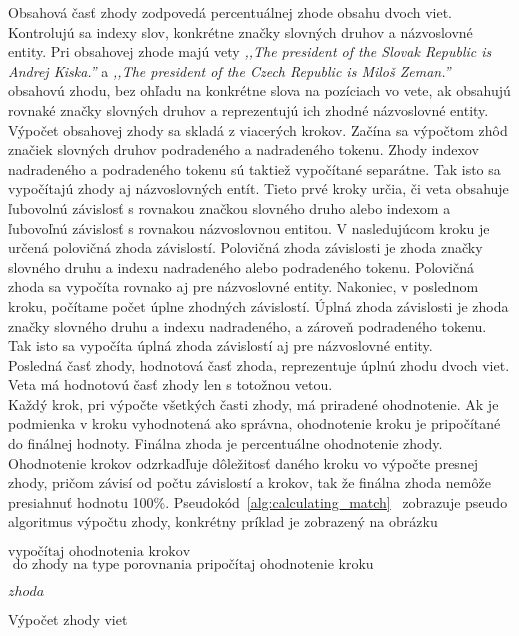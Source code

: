 Obsahová časť zhody zodpovedá percentuálnej zhode obsahu dvoch viet. Kontrolujú sa indexy slov, konkrétne značky slovných druhov a názvoslovné entity. Pri obsahovej zhode majú vety \textit{,,The president of the Slovak Republic is Andrej Kiska.''} a \textit{,,The president of the Czech Republic is Miloš Zeman.''} obsahovú zhodu, bez ohľadu na konkrétne slova na pozíciach vo vete, ak obsahujú rovnaké značky slovných druhov a reprezentujú ich zhodné názvoslovné entity. Výpočet obsahovej zhody sa skladá z viacerých krokov. Začína sa výpočtom zhôd značiek slovných druhov podradeného a nadradeného tokenu. Zhody indexov nadradeného a podradeného tokenu sú taktiež vypočítané separátne. Tak isto sa vypočítajú zhody aj názvoslovných entít. Tieto prvé kroky určia, či veta obsahuje ľubovolnú závislosť s rovnakou značkou slovného druho alebo indexom a ľubovoľnú závislosť s rovnakou názvoslovnou entitou. V nasledujúcom kroku je určená polovičná zhoda závislostí. Polovičná zhoda závislosti je zhoda značky slovného druhu a indexu nadradeného alebo podradeného tokenu. Polovičná zhoda sa vypočíta rovnako aj pre názvoslovné entity. Nakoniec, v poslednom kroku, počítame počet úplne zhodných závislostí. Úplná zhoda závislosti je zhoda značky slovného druhu a indexu nadradeného, a zároveň podradeného tokenu. Tak isto sa vypočíta úplná zhoda závislostí aj pre názvoslovné entity. \\

Posledná časť zhody, hodnotová časť zhoda, reprezentuje úplnú zhodu dvoch viet. Veta má hodnotovú časť zhody len s totožnou vetou. \\

Každý krok, pri výpočte všetkých časti zhody, má priradené ohodnotenie. Ak je podmienka v kroku vyhodnotená ako správna, ohodnotenie kroku je pripočítané do finálnej hodnoty. Finálna zhoda je percentuálne ohodnotenie zhody. Ohodnotenie krokov odzrkadľuje dôležitosť daného kroku vo výpočte presnej zhody, pričom závisí od počtu závislostí a krokov, tak že finálna zhoda nemôže presiahnuť hodnotu 100\%. Pseudokód~\ref{alg:calculating_match}~ zobrazuje pseudo algoritmus výpočtu zhody, konkrétny príklad je zobrazený na obrázku~

\begin{algorithm}[H]
	\footnotesize %
	\begin{algorithmic}[1]

		\State $\text{vypočítaj ohodnotenia krokov}$
		\State $\text{ do zhody na type porovnania pripočítaj ohodnotenie kroku}$
		\EndIf
		\EndFor
		\EndFor
		\EndFor
		
		\Return $zhoda$
		\EndProcedure
	\end{algorithmic}
	\caption[Výpočet zhody viet]{Výpočet zhody viet}	
	\label{alg:calculating_match}
\end{algorithm}

